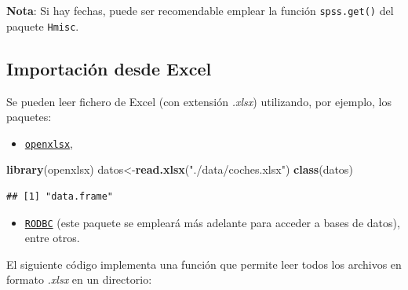 \documentclass[
]{book}
\newenvironment{Shaded}{\begin{snugshade}}{\end{snugshade}}
\newcommand{\FunctionTok}[1]{\textcolor[rgb]{0.13,0.29,0.53}{\textbf{#1}}}
\newcommand{\NormalTok}[1]{#1}
\newcommand{\OtherTok}[1]{\textcolor[rgb]{0.56,0.35,0.01}{#1}}
\newcommand{\StringTok}[1]{\textcolor[rgb]{0.31,0.60,0.02}{#1}}
\providecommand{\tightlist}{%
  \setlength{\itemsep}{0pt}\setlength{\parskip}{0pt}}
\begin{document}
\normalsize

\textbf{Nota}: Si hay fechas, puede ser recomendable emplear la función \texttt{spss.get()} del paquete \texttt{Hmisc}.

\hypertarget{importaciuxf3n-desde-excel}{%
\subsection{Importación desde Excel}\label{importaciuxf3n-desde-excel}}

Se pueden leer fichero de Excel (con extensión \emph{.xlsx}) utilizando, por ejemplo, los paquetes:

\begin{itemize}
\tightlist
\item
  \href{https://cran.r-project.org/web/packages/openxlsx/index.html}{\texttt{openxlsx}},
\end{itemize}

\begin{Shaded}
\begin{Highlighting}[]
\FunctionTok{library}\NormalTok{(openxlsx)}
\NormalTok{datos}\OtherTok{\textless{}{-}}\FunctionTok{read.xlsx}\NormalTok{(}\StringTok{"./data/coches.xlsx"}\NormalTok{)}
\FunctionTok{class}\NormalTok{(datos)}
\end{Highlighting}
\end{Shaded}

\begin{verbatim}
## [1] "data.frame"
\end{verbatim}

\begin{itemize}
\tightlist
\item
  \href{https://cran.r-project.org/web/packages/RODBC/index.html}{\texttt{RODBC}} (este paquete se empleará más adelante para acceder a bases de datos),
  entre otros.
\end{itemize}

El siguiente código implementa una función que permite leer todos
los archivos en formato \emph{.xlsx} en un directorio:
\end{document}
